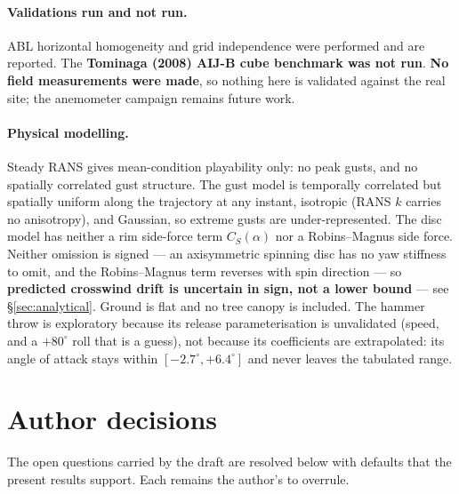 \documentclass[11pt,letterpaper]{article}
\begin{document}
\paragraph{Validations run and not run.} ABL horizontal homogeneity and grid
independence were performed and are reported. The \textbf{Tominaga (2008) AIJ-B
cube benchmark was not run}. \textbf{No field measurements were made}, so
nothing here is validated against the real site; the anemometer campaign
remains future work.

\paragraph{Physical modelling.} Steady RANS gives mean-condition playability
only: no peak gusts, and no spatially correlated gust structure. The gust model
is temporally correlated but spatially uniform along the trajectory at any
instant, isotropic (RANS $k$ carries no anisotropy), and Gaussian, so extreme
gusts are under-represented. The disc model has neither a rim side-force term
$C_S(\alpha)$ nor a Robins--Magnus side force. Neither omission is signed --- an
axisymmetric spinning disc has no yaw stiffness to omit, and the Robins--Magnus term
reverses with spin direction --- so \textbf{predicted crosswind drift is
uncertain in sign, not a lower bound} --- see \S\ref{sec:analytical}. Ground is flat and
no tree canopy is included. The hammer throw is exploratory because its release
parameterisation is unvalidated (speed, and a $+80^\circ$ roll that is a guess), not
because its coefficients are extrapolated: its angle of attack stays within
$[-2.7^\circ, +6.4^\circ]$ and never leaves the tabulated range.

\section{Author decisions}
\label{sec:decisions}

The open questions carried by the draft are resolved below with defaults that
the present results support. Each remains the author's to overrule.
\end{document}
